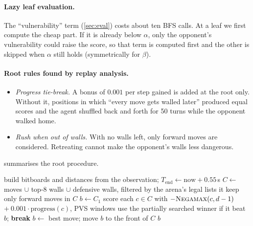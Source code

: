 \paragraph{Lazy leaf evaluation.}
The ``vulnerability'' term (\cref{sec:eval}) costs about ten BFS calls. At a leaf we first
compute the cheap part. If it is already below $\alpha$, only the opponent's vulnerability could
raise the score, so that term is computed first and the other is skipped when $\alpha$ still
holds (symmetrically for $\beta$).

\paragraph{Root rules found by replay analysis.}
\begin{itemize}
  \item \emph{Progress tie-break.} A bonus of $0.001$ per step gained is added at the root
        only. Without it, positions in which ``every move gets walled later'' produced equal
        scores and the agent shuffled back and forth for 50 turns while the opponent walked home.
  \item \emph{Rush when out of walls.} With no walls left, only forward moves are considered.
        Retreating cannot make the opponent's walls less dangerous.
\end{itemize}

 summarises the root procedure.

\begin{algorithm}[!htbp]
\caption{Root procedure of  (simplified)}
\label{alg:root}
\begin{algorithmic}[1]
\State build bitboards and distances from the observation; $T_{\text{end}} \gets \text{now} + 0.55$\,s
\State $C \gets$ moves $\cup$ top-8 walls $\cup$ defensive walls, filtered by the arena's legal lists
 \Return it \EndIf
{} keep only forward moves in $C$ \EndIf
\State $b \gets C_1$
  \State score each $c \in C$ with $-\textsc{Negamax}(c, d-1)$ $+\ 0.001\cdot\text{progress}(c)$, PVS windows
   use the partially searched winner if it beat $b$; \textbf{break} \EndIf
  \State $b \gets$ best move; move $b$ to the front of $C$
\EndFor
\State \Return $b$ 
\end{algorithmic}
\end{algorithm}

